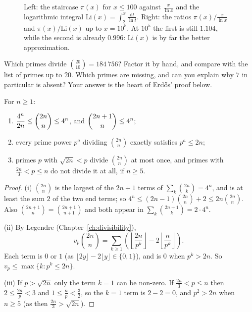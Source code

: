 \begin{figure}[ht]
\centering
{}
\caption{Left: the staircase $\pi(x)$ for $x\le100$ against $\frac x{\ln x}$ and the logarithmic integral $\mathrm{Li}(x)=\int_2^x\frac{\mathrm dt}{\ln t}$. Right: the ratios $\pi(x)\big/\frac x{\ln x}$ and $\pi(x)/\mathrm{Li}(x)$ up to $x=10^5$. At $10^5$ the first is still $1.104$, while the second is already $0.996$: $\mathrm{Li}(x)$ is by far the better approximation.}
\label{fig:primecount}
\end{figure}

\begin{think}
Which primes divide $\binom{20}{10}=184\,756$? Factor it by hand, and compare with the list of primes up to $20$. Which primes are missing, and can you explain why $7$ in particular is absent? Your answer is the heart of Erd\H{o}s' proof below.
\end{think}

\begin{lemma}\label{lem:binom}
For $n\ge1$:
\begin{enumerate}[label=(\roman*)]
\item $\dfrac{4^n}{2n}\le\dbinom{2n}n\le4^n$, and $\dbinom{2n+1}n\le4^n$;
\item every prime power $p^a$ dividing $\binom{2n}n$ exactly satisfies $p^a\le2n$;
\item primes $p$ with $\sqrt{2n}<p$ divide $\binom{2n}n$ at most once, and primes with $\frac{2n}3<p\le n$ do not divide it at all, if $n\ge5$.
\end{enumerate}
\end{lemma}
\begin{proof}
(i) $\binom{2n}n$ is the largest of the $2n+1$ terms of $\sum_k\binom{2n}k=4^n$, and is at least the sum $2$ of the two end terms; so $4^n\le(2n-1)\binom{2n}n+2\le2n\binom{2n}n$. Also $\binom{2n+1}n=\binom{2n+1}{n+1}$ and both appear in $\sum_k\binom{2n+1}k=2\cdot4^n$.

(ii) By Legendre (Chapter~\ref{ch:divisibility}),
\[v_p\binom{2n}n=\sum_{k\ge1}\left(\left\lfloor\frac{2n}{p^k}\right\rfloor-2\left\lfloor\frac n{p^k}\right\rfloor\right).\]
Each term is $0$ or $1$ (as $\lfloor2y\rfloor-2\lfloor y\rfloor\in\{0,1\}$), and is $0$ when $p^k>2n$. So $v_p\le\max\{k:p^k\le2n\}$.

(iii) If $p>\sqrt{2n}$ only the term $k=1$ can be non-zero. If $\frac{2n}3<p\le n$ then $2\le\frac{2n}p<3$ and $1\le\frac np<\frac32$, so the $k=1$ term is $2-2=0$, and $p^2>2n$ when $n\ge5$ (as then $\frac{2n}3>\sqrt{2n}$).
\end{proof}

